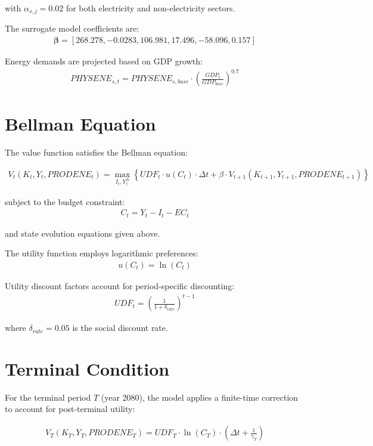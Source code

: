 \documentclass{article}
\begin{document}
with $\alpha_{s,j} = 0.02$ for both electricity and non-electricity sectors.

The surrogate model coefficients are:
\begin{align}
\boldsymbol{\beta} = [268.278, -0.0283, 106.981, 17.496, -58.096, 0.157]
\end{align}

Energy demands are projected based on GDP growth:
\begin{align}
PHYSENE_{s,t} = PHYSENE_{s,base} \cdot \left(\frac{GDP_t}{GDP_{base}}\right)^{0.7}
\end{align}

\section{Bellman Equation}

The value function satisfies the Bellman equation:

\begin{align}
V_t(K_t, Y_t, PRODENE_t) = \max_{I_t, Y_t^N} \left\{ UDF_t \cdot u(C_t) \cdot \Delta t + \beta \cdot V_{t+1}(K_{t+1}, Y_{t+1}, PRODENE_{t+1}) \right\}
\end{align}

subject to the budget constraint:
\begin{align}
C_t = Y_t - I_t - EC_t
\end{align}

and state evolution equations given above.

The utility function employs logarithmic preferences:
\begin{align}
u(C_t) = \ln(C_t)
\end{align}

Utility discount factors account for period-specific discounting:
\begin{align}
UDF_t = \left(\frac{1}{1 + \delta_{rate}}\right)^{t-1}
\end{align}

where $\delta_{rate} = 0.05$ is the social discount rate.

\section{Terminal Condition}

For the terminal period $T$ (year 2080), the model applies a finite-time correction to account for post-terminal utility:

\begin{align}
V_T(K_T, Y_T, PRODENE_T) = UDF_T \cdot \ln(C_T) \cdot \left(\Delta t + \frac{1}{\gamma_{T}}\right)
\end{align}
\end{document}
